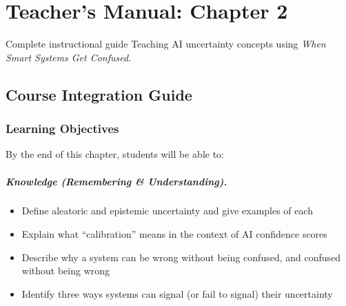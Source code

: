 
\chapter{Teacher's Manual: Chapter 2}
\label{ch:teacher-ch02}

\begin{chapterquote}{Complete instructional guide}
Teaching AI uncertainty concepts using \emph{When Smart Systems Get Confused}.
\end{chapterquote}

\section{Course Integration Guide}

\subsection{Learning Objectives}

By the end of this chapter, students will be able to:

\paragraph{Knowledge (Remembering \& Understanding).}
\begin{itemize}
    \item Define aleatoric and epistemic uncertainty and give examples of each
    \item Explain what ``calibration'' means in the context of AI confidence scores
    \item Describe why a system can be wrong without being confused, and confused without being wrong
    \item Identify three ways systems can signal (or fail to signal) their uncertainty
\end{itemize}

